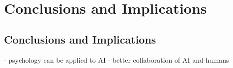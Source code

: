 \section{Conclusions and Implications}
\subsection{Conclusions and Implications}
- psychology can be applied to AI
- better collaboration of AI and humans